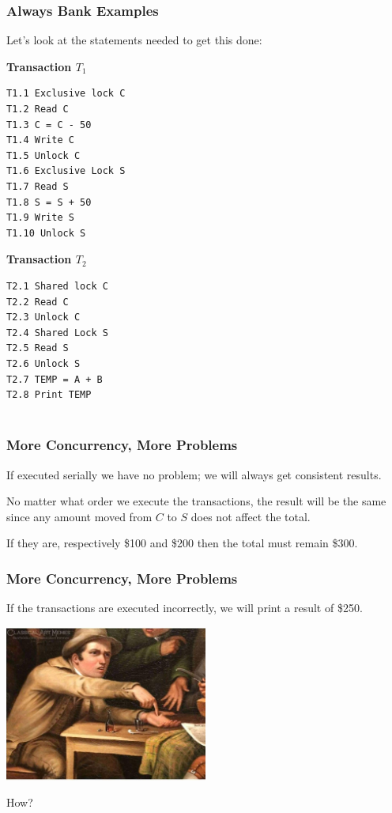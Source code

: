 \begin{frame}[fragile]
\frametitle{Always Bank Examples}

Let's look at the statements needed to get this done:

\begin{multicols}{2}
\textbf{Transaction $T_{1}$}
\begin{verbatim}
T1.1 Exclusive lock C
T1.2 Read C
T1.3 C = C - 50
T1.4 Write C
T1.5 Unlock C
T1.6 Exclusive Lock S
T1.7 Read S
T1.8 S = S + 50
T1.9 Write S
T1.10 Unlock S
\end{verbatim}

\columnbreak
\textbf{Transaction $T_{2}$}
\begin{verbatim}
T2.1 Shared lock C
T2.2 Read C
T2.3 Unlock C
T2.4 Shared Lock S
T2.5 Read S
T2.6 Unlock S
T2.7 TEMP = A + B
T2.8 Print TEMP


\end{verbatim}
\end{multicols}


\end{frame}

\begin{frame}
\frametitle{More Concurrency, More Problems}

If executed serially we have no problem; we will always get consistent results. 

No matter what order we execute the transactions, the result will be the same since any amount moved from $C$ to $S$ does not affect the total. 

If they are, respectively \$100 and \$200 then the total must remain \$300. 


\end{frame}

\begin{frame}
\frametitle{More Concurrency, More Problems}


If the transactions are executed incorrectly, we will print a result of \$250. 

\begin{center}
	\includegraphics[width=0.5\textwidth]{images/give-money.png}
\end{center}

How?


\end{frame}

